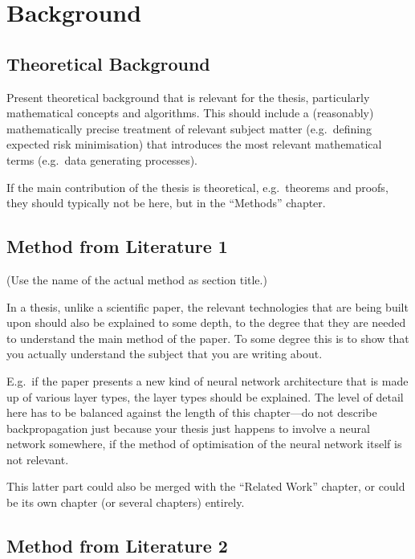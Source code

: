 \chapter{Background}\label{chap:background}

\section{Theoretical Background}

Present theoretical background that is relevant for the thesis, particularly mathematical concepts and algorithms.
This should include a (reasonably) mathematically precise treatment of relevant subject matter (e.g.\ defining expected risk minimisation) that introduces the most relevant mathematical terms (e.g.\ data generating processes).

If the main contribution of the thesis is theoretical, e.g.\ theorems and proofs, they should typically not be here, but in the ``Methods'' chapter. 

\section{Method from Literature 1}

(Use the name of the actual method as section title.)

In a thesis, unlike a scientific paper, the relevant technologies that are being built upon should also be explained to some depth, to the degree that they are needed to understand the main method of the paper.
To some degree this is to show that you actually understand the subject that you are writing about.

E.g.\ if the paper presents a new kind of neural network architecture that is made up of various layer types, the layer types should be explained.
The level of detail here has to be balanced against the length of this chapter---do not describe backpropagation just because your thesis just happens to involve a neural network somewhere, if the method of optimisation of the neural network itself is not relevant.

This latter part could also be merged with the ``Related Work'' chapter, or could be its own chapter (or several chapters) entirely.

\section{Method from Literature 2}

